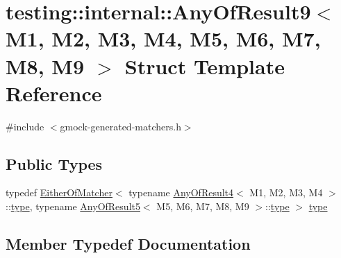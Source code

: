 \hypertarget{structtesting_1_1internal_1_1_any_of_result9}{}\section{testing\+:\+:internal\+:\+:Any\+Of\+Result9$<$ M1, M2, M3, M4, M5, M6, M7, M8, M9 $>$ Struct Template Reference}
\label{structtesting_1_1internal_1_1_any_of_result9}


{\ttfamily \#include $<$gmock-\/generated-\/matchers.\+h$>$}

\subsection*{Public Types}
\begin{DoxyCompactItemize}
\item 
typedef \hyperlink{classtesting_1_1internal_1_1_either_of_matcher}{Either\+Of\+Matcher}$<$ typename \hyperlink{structtesting_1_1internal_1_1_any_of_result4}{Any\+Of\+Result4}$<$ M1, M2, M3, M4 $>$\+::\hyperlink{structtesting_1_1internal_1_1_any_of_result9_a308935fb02c62f502044dcc7b0a2b464}{type}, typename \hyperlink{structtesting_1_1internal_1_1_any_of_result5}{Any\+Of\+Result5}$<$ M5, M6, M7, M8, M9 $>$\+::\hyperlink{structtesting_1_1internal_1_1_any_of_result9_a308935fb02c62f502044dcc7b0a2b464}{type} $>$ \hyperlink{structtesting_1_1internal_1_1_any_of_result9_a308935fb02c62f502044dcc7b0a2b464}{type}
\end{DoxyCompactItemize}


\subsection{Member Typedef Documentation}
\mbox{\label{structtesting_1_1internal_1_1_any_of_result9_a308935fb02c62f502044dcc7b0a2b464}} 
